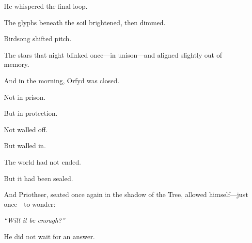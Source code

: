 \documentclass[9pt]{article}
\begin{document}
\vspace{0.5em}
He whispered the final loop.

\vspace{0.5em}
The glyphs beneath the soil brightened, then dimmed.

\vspace{0.5em}
Birdsong shifted pitch.

\vspace{0.5em}
The stars that night blinked once---in unison---and aligned slightly out of memory.

\vspace{0.5em}
And in the morning, Orfyd was closed.

\vspace{0.5em}
Not in prison.

\vspace{0.5em}
But in protection.

\vspace{0.5em}
Not walled off.

\vspace{0.5em}
But walled in.

\vspace{0.5em}
The world had not ended.

\vspace{0.5em}
But it had been sealed.

\vspace{0.5em}
And Priotheer, seated once again in the shadow of the Tree, allowed himself---just once---to wonder:

\vspace{0.5em}
\textit{``Will it be enough?''}

\vspace{0.5em}
He did not wait for an answer.

\newpage
\end{document}
